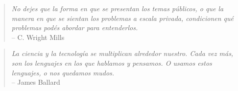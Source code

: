 \begin{quote}
\emph{No dejes que la forma en que se presentan los temas públicos,
o que la manera en que se sientan los problemas a escala privada,
condicionen qué problemas podés abordar para entenderlos.}\\
-- C. Wright Mills
\end{quote}

\begin{quote}
\emph{La ciencia y la tecnología se multiplican alrededor nuestro.
Cada vez más, son los lenguajes en los que hablamos y pensamos.
O usamos estos lenguajes, o nos quedamos mudos.}\\
-- James Ballard
\end{quote}